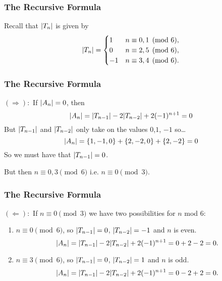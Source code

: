 \documentclass{beamer}
\DeclarePairedDelimiter\abs{\lvert}{\rvert}%
\begin{document}
\begin{frame}
\frametitle{The Recursive Formula}
Recall that $\abs{T_n}$ is given by 
\[
    \abs{T_n} = 
    \begin{cases}
        1 & n \equiv 0, 1 \pmod{6},\\
        0 & n \equiv 2, 5 \pmod{6},\\
        -1 & n \equiv 3,4 \pmod{6}.
    \end{cases}
\]
\end{frame}

\begin{frame}
\frametitle{The Recursive Formula}

$(\Rightarrow):$ If $\abs{A_n}=0$, then
\[
    \abs{A_n} = \abs{T_{n-1}} - 2\abs{T_{n-2}} + 2(-1)^{n+1} = 0
\]
\pause
But $\abs{T_{n-1}}$ and $\abs{T_{n-2}}$ only take on the values $0$,$1$, $-1$ so\ldots
\[
    \abs{A_n} = \{1,-1,0\} + \{2,-2,0\} + \{2,-2\} = 0
\]
\pause
So we must have that $\abs{T_{n-1}} = 0$. 
\pause

But then $n\equiv 0,3 \pmod{6}$ i.e. $n\equiv 0 \pmod{3}$.
\end{frame}

\begin{frame}
\frametitle{The Recursive Formula}

$(\Leftarrow):$ If $n\equiv 0 \pmod 3$ we have two possibilities for $n$ mod $6$:
\pause
\begin{enumerate}
    \item $n\equiv 0 \pmod{6}$, so $\abs{T_{n-1}} = 0$, $\abs{T_{n-2}}=-1$ and $n$ is
        even.
        \[ 
            \abs{A_n} = \abs{T_{n-1}} - 2\abs{T_{n-2}} + 2(-1)^{n+1} = 0 + 2 -2 = 0.
        \]
        \pause
    \item $n\equiv 3 \pmod{6}$, so $\abs{T_{n-1}} = 0$, $\abs{T_{n-2}}=1$ and $n$ is
        odd.
        \[ 
            \abs{A_n} = \abs{T_{n-1}} - 2\abs{T_{n-2}} + 2(-1)^{n+1} = 0 - 2 +2 = 0.
        \]
\end{enumerate}
\end{frame}
\end{document}
